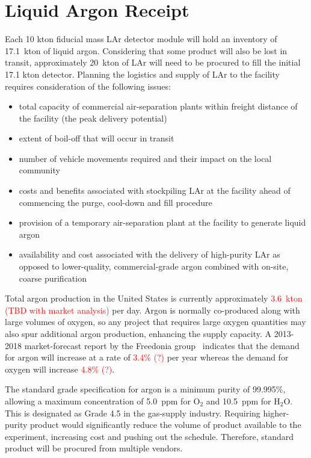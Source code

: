 \section{Liquid Argon Receipt}

Each 10 kton fiducial mass LAr detector module will hold an inventory 
of 17.1~kton of liquid argon.   
Considering that some product will also be lost in transit, approximately 
20~kton of LAr will need to be procured to fill 
the initial 17.1 kton detector.  Planning the 
logistics and supply of LAr to the facility requires consideration of the following issues:

\begin{itemize}
\item  total capacity of commercial air-separation plants within freight distance of the facility (the peak delivery potential)
\item extent of boil-off that will occur in transit
\item  number of vehicle movements required and their impact on the local community
\item costs and benefits associated with stockpiling LAr at the facility ahead of commencing the purge, cool-down and fill procedure
\item provision of a temporary air-separation plant at the facility to generate liquid argon
\item  availability and cost associated with the delivery of high-purity LAr as opposed to lower-quality, commercial-grade argon combined with on-site, coarse purification
\end{itemize}

Total argon production in the United States is currently approximately 
\textcolor{red}{3.6~kton (TBD with market analysis)} per day. Argon is normally co-produced 
along with large volumes of oxygen, so any project that requires large 
oxygen quantities may also spur additional argon production, enhancing the
supply capacity.  A 2013-2018 market-forecast report by the Freedonia 
group~\cite{freedonia} indicates that the demand for argon will increase 
at a rate of \textcolor{red}{3.4\% (?)} per year whereas the demand 
for oxygen will increase \textcolor{red}{4.8\% (?)}.  

The standard grade specification for argon is a minimum purity of
 99.995\%, allowing a maximum concentration of 5.0~ppm for O$_2$ 
and 10.5~ppm for H$_{2}$O.  This is designated as Grade 4.5 in 
the gas-supply industry.  Requiring higher-purity product would 
significantly reduce the volume of product available to the 
experiment, increasing cost and pushing out the schedule.  
Therefore, standard product will be procured from multiple vendors.  

